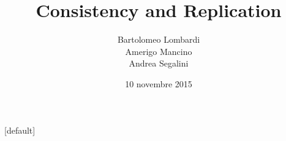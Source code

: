 \documentclass[10pt]{beamer}
\title{Consistency and Replication}
\author{Bartolomeo Lombardi \\ Amerigo Mancino \\ Andrea Segalini}
\date{10 novembre 2015}
\theoremstyle{definition}
\begin{document}
{
\makeatletter
    [default]
    \def\beamer@entrycode{\vspace*{-\headheight}}
\makeatother
\begin{frame}
	\maketitle
\end{frame}
}






\end{document}

